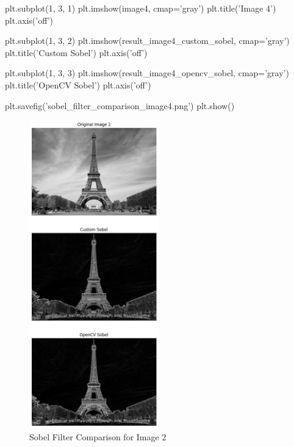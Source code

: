\documentclass[12pt]{article}
\begin{document}
\begin{python}
plt.subplot(1, 3, 1)
plt.imshow(image4, cmap='gray')
plt.title('Image 4')
plt.axis('off')

plt.subplot(1, 3, 2)
plt.imshow(result_image4_custom_sobel, cmap='gray')
plt.title('Custom Sobel')
plt.axis('off')

plt.subplot(1, 3, 3)
plt.imshow(result_image4_opencv_sobel, cmap='gray')
plt.title('OpenCV Sobel')
plt.axis('off')

plt.savefig('sobel_filter_comparison_image4.png')
plt.show()
  \end{python}

  \begin{figure}
    \centering
    \includegraphics[width=0.5\textwidth]{sobel_filter_comparison_image2.png}
    \caption{Sobel Filter Comparison for Image 2}
    \label{fig:example}
  \end{figure}
\end{document}
